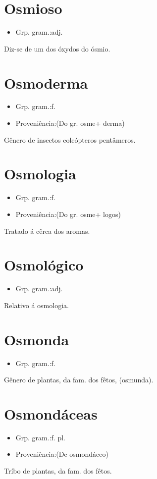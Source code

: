 \section{Osmioso}
\begin{itemize}
\item {Grp. gram.:adj.}
\end{itemize}
Diz-se de um dos óxydos do ósmio.
\section{Osmoderma}
\begin{itemize}
\item {Grp. gram.:f.}
\end{itemize}
\begin{itemize}
\item {Proveniência:(Do gr. \textunderscore osme\textunderscore  + \textunderscore derma\textunderscore )}
\end{itemize}
Gênero de insectos coleópteros pentâmeros.
\section{Osmologia}
\begin{itemize}
\item {Grp. gram.:f.}
\end{itemize}
\begin{itemize}
\item {Proveniência:(Do gr. \textunderscore osme\textunderscore  + \textunderscore logos\textunderscore )}
\end{itemize}
Tratado á cêrca dos aromas.
\section{Osmológico}
\begin{itemize}
\item {Grp. gram.:adj.}
\end{itemize}
Relativo á osmologia.
\section{Osmonda}
\begin{itemize}
\item {Grp. gram.:f.}
\end{itemize}
Gênero de plantas, da fam. dos fêtos, (\textunderscore osmunda\textunderscore ).
\section{Osmondáceas}
\begin{itemize}
\item {Grp. gram.:f. pl.}
\end{itemize}
\begin{itemize}
\item {Proveniência:(De \textunderscore osmondáceo\textunderscore )}
\end{itemize}
Tríbo de plantas, da fam. dos fêtos.
